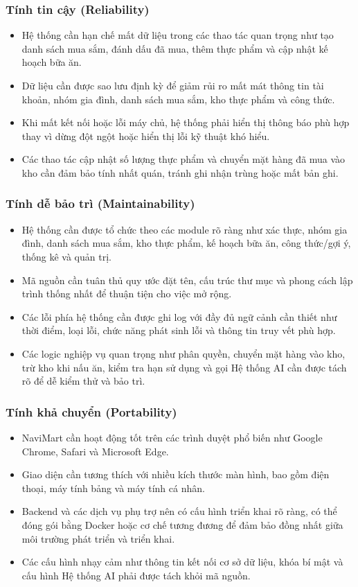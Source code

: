 \documentclass[../main.tex]{subfiles}
\begin{document}
\subsubsection{Tính tin cậy (Reliability)}
\begin{itemize}
    \item Hệ thống cần hạn chế mất dữ liệu trong các thao tác quan trọng như tạo danh sách mua sắm, đánh dấu đã mua, thêm thực phẩm và cập nhật kế hoạch bữa ăn.
    \item Dữ liệu cần được sao lưu định kỳ để giảm rủi ro mất mát thông tin tài khoản, nhóm gia đình, danh sách mua sắm, kho thực phẩm và công thức.
    \item Khi mất kết nối hoặc lỗi máy chủ, hệ thống phải hiển thị thông báo phù hợp thay vì dừng đột ngột hoặc hiển thị lỗi kỹ thuật khó hiểu.
    \item Các thao tác cập nhật số lượng thực phẩm và chuyển mặt hàng đã mua vào kho cần đảm bảo tính nhất quán, tránh ghi nhận trùng hoặc mất bản ghi.
\end{itemize}

\subsubsection{Tính dễ bảo trì (Maintainability)}
\begin{itemize}
    \item Hệ thống cần được tổ chức theo các module rõ ràng như xác thực, nhóm gia đình, danh sách mua sắm, kho thực phẩm, kế hoạch bữa ăn, công thức/gợi ý, thống kê và quản trị.
    \item Mã nguồn cần tuân thủ quy ước đặt tên, cấu trúc thư mục và phong cách lập trình thống nhất để thuận tiện cho việc mở rộng.
    \item Các lỗi phía hệ thống cần được ghi log với đầy đủ ngữ cảnh cần thiết như thời điểm, loại lỗi, chức năng phát sinh lỗi và thông tin truy vết phù hợp.
    \item Các logic nghiệp vụ quan trọng như phân quyền, chuyển mặt hàng vào kho, trừ kho khi nấu ăn, kiểm tra hạn sử dụng và gọi Hệ thống AI cần được tách rõ để dễ kiểm thử và bảo trì.
\end{itemize}

\subsubsection{Tính khả chuyển (Portability)}
\begin{itemize}
    \item NaviMart cần hoạt động tốt trên các trình duyệt phổ biến như Google Chrome, Safari và Microsoft Edge.
    \item Giao diện cần tương thích với nhiều kích thước màn hình, bao gồm điện thoại, máy tính bảng và máy tính cá nhân.
    \item Backend và các dịch vụ phụ trợ nên có cấu hình triển khai rõ ràng, có thể đóng gói bằng Docker hoặc cơ chế tương đương để đảm bảo đồng nhất giữa môi trường phát triển và triển khai.
    \item Các cấu hình nhạy cảm như thông tin kết nối cơ sở dữ liệu, khóa bí mật và cấu hình Hệ thống AI phải được tách khỏi mã nguồn.
\end{itemize}
\end{document}
